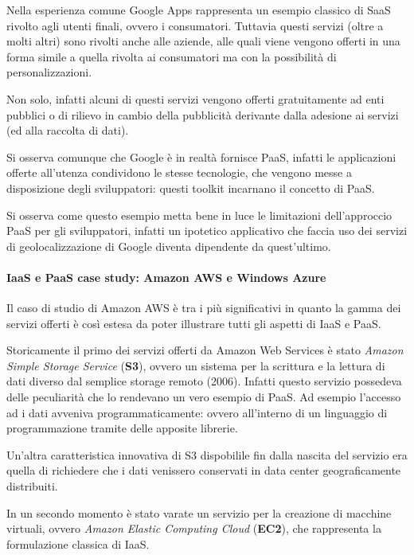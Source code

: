 \documentclass[italian,]{article}
\let\oldparagraph\paragraph
\renewcommand{\paragraph}[1]{\oldparagraph{#1}\mbox{}}
\begin{document}
Nella esperienza comune Google Apps rappresenta un esempio classico di
SaaS rivolto agli utenti finali, ovvero i consumatori. Tuttavia questi
servizi (oltre a molti altri) sono rivolti anche alle aziende, alle
quali viene vengono offerti in una forma simile a quella rivolta ai
consumatori ma con la possibilità di personalizzazioni.

Non solo, infatti alcuni di questi servizi vengono offerti gratuitamente
ad enti pubblici o di rilievo in cambio della pubblicità derivante dalla
adesione ai servizi (ed alla raccolta di dati).

Si osserva comunque che Google è in realtà fornisce PaaS, infatti le
applicazioni offerte all'utenza condividono le stesse tecnologie, che
vengono messe a disposizione degli sviluppatori: questi toolkit
incarnano il concetto di PaaS.

Si osserva come questo esempio metta bene in luce le limitazioni
dell'approccio PaaS per gli sviluppatori, infatti un ipotetico
applicativo che faccia uso dei servizi di geolocalizzazione di Google
diventa dipendente da quest'ultimo.

\paragraph{IaaS e PaaS case study: Amazon AWS e Windows
Azure}\label{iaas-e-paas-case-study-amazon-aws-e-windows-azure}

Il caso di studio di Amazon AWS è tra i più significativi in quanto la
gamma dei servizi offerti è così estesa da poter illustrare tutti gli
aspetti di IaaS e PaaS.

Storicamente il primo dei servizi offerti da Amazon Web Services è stato
\emph{Amazon Simple Storage Service} (\textbf{S3}), ovvero un sistema
per la scrittura e la lettura di dati diverso dal semplice storage
remoto (2006). Infatti questo servizio possedeva delle peculiarità che
lo rendevano un vero esempio di PaaS. Ad esempio l'accesso ad i dati
avveniva programmaticamente: ovvero all'interno di un linguaggio di
programmazione tramite delle apposite librerie.

Un'altra caratteristica innovativa di S3 dispobilile fin dalla nascita
del servizio era quella di richiedere che i dati venissero conservati in
data center geograficamente distribuiti.

In un secondo momento è stato varate un servizio per la creazione di
macchine virtuali, ovvero \emph{Amazon Elastic Computing Cloud}
(\textbf{EC2}), che rappresenta la formulazione classica di IaaS.
\end{document}
